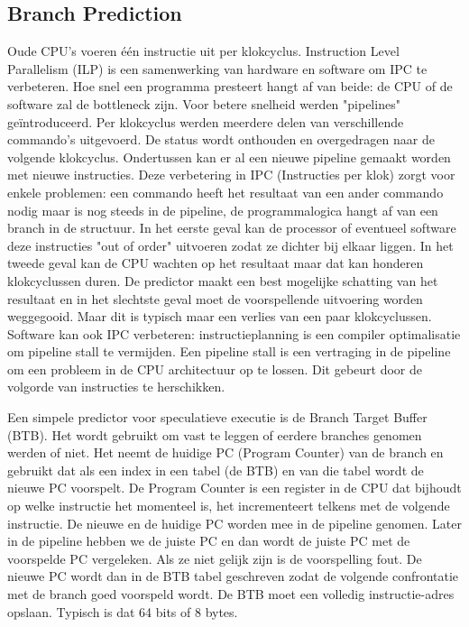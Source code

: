 \subsection{Branch Prediction}
Oude CPU's voeren één instructie uit per klokcyclus.
Instruction Level Parallelism (ILP) is een samenwerking van hardware en software om IPC te verbeteren. Hoe snel een programma presteert hangt af van beide: de CPU of de software zal de bottleneck zijn.
 Voor betere snelheid werden "pipelines" geïntroduceerd. Per klokcyclus werden meerdere delen van verschillende commando's uitgevoerd. De status wordt onthouden en overgedragen naar de volgende klokcyclus. Ondertussen kan er al een nieuwe pipeline gemaakt worden met nieuwe instructies. Deze verbetering in IPC (Instructies per klok) zorgt voor enkele problemen: een commando heeft het resultaat van een ander commando nodig maar is nog steeds in de pipeline, de programmalogica hangt af van een branch in de structuur. In het eerste geval kan de processor of eventueel software deze instructies "out of order" uitvoeren zodat ze dichter bij elkaar liggen. In het tweede geval kan de CPU wachten op het resultaat maar dat kan honderen klokcyclussen duren. De predictor maakt een best mogelijke schatting van het resultaat en in het slechtste geval moet de voorspellende uitvoering  worden weggegooid.
Maar dit is typisch maar een verlies van een paar klokcyclussen.
Software kan ook IPC verbeteren: instructieplanning is een compiler optimalisatie om pipeline stall te vermijden.
Een pipeline stall is een vertraging in de pipeline om een probleem in de CPU architectuur op te lossen. 
Dit gebeurt door de volgorde van instructies te herschikken.

Een simpele predictor voor speculatieve executie is de Branch Target Buffer (BTB). Het wordt gebruikt om vast te leggen of eerdere branches genomen werden of niet.
Het neemt de huidige PC (Program Counter) van de branch en gebruikt dat als een index in een tabel (de BTB) en van die tabel wordt de nieuwe PC voorspelt.
De Program Counter is een register in de CPU dat bijhoudt op welke instructie het momenteel is, het incrementeert telkens met de volgende instructie.\parencite{Katzan1971}
De nieuwe en de huidige PC worden mee in de pipeline genomen. Later in de pipeline hebben we de juiste PC en dan wordt de juiste PC met de voorspelde PC vergeleken. Als ze niet gelijk zijn is de voorspelling fout. De nieuwe PC wordt dan in de BTB tabel geschreven zodat de volgende confrontatie met de branch goed voorspeld wordt.
De BTB moet een volledig instructie-adres opslaan. Typisch is dat 64 bits of 8 bytes.

